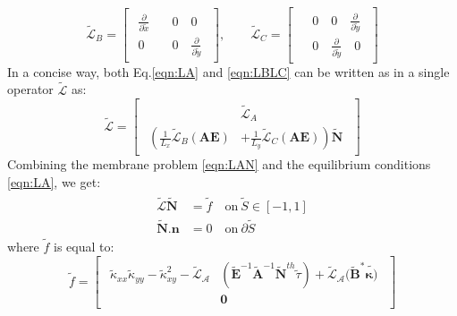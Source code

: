 \documentclass[journal]{new-aiaa}
\begin{document}
\begin{equation}
\label{eqn:LBLC}
\mathcal{\tilde{L}}_B=
\begin{bmatrix}
\begin{aligned}
\frac{\partial}{\partial \tilde{x}} \quad  &0 \quad  0 \\ 0 \quad  &0 \quad  \frac{\partial}{\partial \tilde{y}} 
\end{aligned}
\end{bmatrix}, \qquad
\mathcal{\tilde{L}}_C=
\begin{bmatrix}
\begin{aligned}
&0 \quad 0 \quad \frac{\partial}{\partial \tilde{y}} \\ &0 \quad \frac{\partial}{\partial \tilde{y}}\quad 0 
\end{aligned}
\end{bmatrix}
\end{equation}
In a concise way, both Eq.\ref{eqn:LA} and \ref{eqn:LBLC} can be written as in a single operator $\mathcal{\tilde{L}}$ as:
\begin{equation}
\label{eqn:Lop}
\mathcal{\tilde{L}}=
\begin{bmatrix}
\begin{aligned}
&\mathcal{\tilde{L}}_A
\\  \left(\frac{1}{L_x}\mathcal{\tilde{L}}_B(\bm{A}\bm{E}) \right. & \left. + \frac{1}{L_y}\mathcal{\tilde{L}}_C(\bm{A}\bm{E})\right)\tilde{\bm{N}}
\end{aligned}
\end{bmatrix}
\end{equation}
Combining the membrane problem \ref{eqn:LAN} and the equilibrium conditions \ref{eqn:LA}, we get:
\begin{eqnarray}
\label{eqn:LA}
\begin{aligned}
\mathcal{\tilde{L}}\tilde{\bm{N}}&=\tilde{f} \quad  \text{on} \: \tilde{S} \in \left[-1,1\right] \\
\tilde{\bm{N}}. \boldsymbol{n} &= 0 \quad \text{on} \: \partial \tilde{S}
\end{aligned}
\end{eqnarray}
where $\tilde{f}$ is equal to:
\begin{equation}
\label{eqn:fvecdef}
\tilde{f}=
\begin{bmatrix}
\begin{aligned}
\tilde{\kappa}_{xx}\tilde{\kappa}_{yy} - \tilde{\kappa}_{xy}^2 - \mathcal{\tilde{L}_A}&(\tilde{\bm{E}}^{-1}\tilde{\bm{A}}^{-1}\tilde{\bm{N}}^{th}\tilde{\tau}) + \mathcal{\tilde{L}_A}(\tilde{\bm{B}}^\ast\tilde{\bm\kappa)}
\\  &\mathbf{0}
\end{aligned}
\end{bmatrix}
\end{equation}
\end{document}
